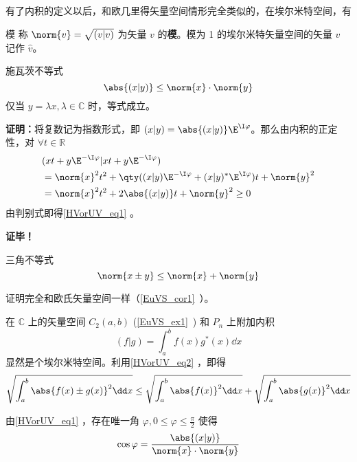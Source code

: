 有了内积的定义以后，和欧几里得矢量空间情形完全类似的，在埃尔米特空间，有
\begin{definition}{模}
称 $\norm{  v}=\sqrt{(  v|  v)}$ 为矢量 $  v$ 的\textbf{模}。模为 1 的埃尔米特矢量空间的矢量 $v$ 记作 $\hat{v}$。
\end{definition} 
\begin{theorem}{施瓦茨不等式}
\begin{equation}\label{HVorUV_eq1}
\abs{(  x|  y)}\leq \norm{  x}\cdot \norm{  y}
\end{equation}
仅当 $  y=\lambda  x,\lambda\in\mathbb{C}$ 时，等式成立。
\end{theorem}
\textbf{证明：}将复数记为指数形式，即 $(  x|  y)=\abs{(  x|  y)}\E^{\I \varphi}$。那么由内积的正定性，对 $\forall t\in\mathbb{R}$
\begin{equation}
\begin{aligned}
&(  x t+  y\E^{-\I\varphi}|  x t+  y\E^{-\I\varphi})\\
&=\norm{  x}^2t^2+\qty((  x|  y)\E^{-\I\varphi}+(  x|  y)^*\E^{\I\varphi})t+\norm{  y}^2\\
&=\norm{  x}^2t^2+2\abs{(  x|  y)}t+\norm{  y}^2\geq0
\end{aligned}
\end{equation}
由判别式即得\autoref{HVorUV_eq1} 。

\textbf{证毕！}
\begin{corollary}{三角不等式}
\begin{equation}\label{HVorUV_eq2}
\norm{  x\pm  y}\leq\norm{  x}+\norm{  y}
\end{equation}
\end{corollary}
证明完全和欧氏矢量空间一样（\autoref{EuVS_cor1}~）。
\begin{example}{}\label{HVorUV_ex1}
在 $\mathbb{C}$ 上的矢量空间 $C_2(a,b)$ (\autoref{EuVS_ex1}~) 和 $P_n$ 上附加内积
\begin{equation}
(f|g)=\int_a^{b}f(x)g^*(x)\dd x
\end{equation}
显然是个埃尔米特空间。利用\autoref{HVorUV_eq2} ，即得
\begin{equation}
\sqrt{\int_a^b\abs{f(x)\pm g(x)}^2\dd x}\leq\sqrt{\int_a^b\abs{f(x)}^2\dd x}+\sqrt{\int_a^b\abs{g(x)}^2\dd x}
\end{equation}
\end{example}
由\autoref{HVorUV_eq1} ，存在唯一角 $\varphi,0\leq\varphi\leq\frac{\pi}{2}$ 使得
\begin{equation}
\cos\varphi=\frac{\abs{(  x|  y)}}{\norm{  x}\cdot \norm{  y}}
\end{equation}
